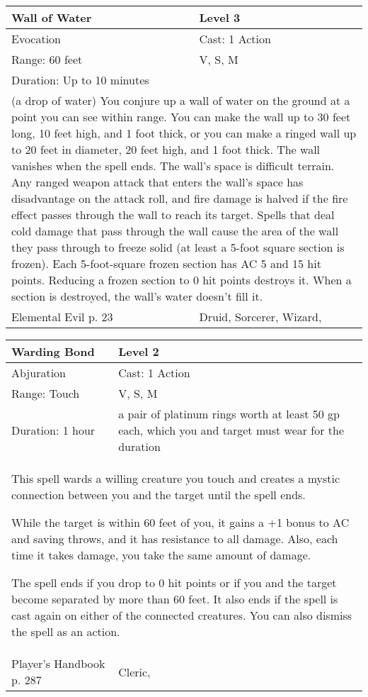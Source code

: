 \documentclass[11pt]{report}
\begin{document}
\begin{table}[H]
	\begin{tabular}{||p{6cm}|p{6cm}||}
		\hline\hline
		\bf{Wall of Water} & Level 3\\ \hline
		Evocation & Cast: 1 Action\\ \hline
		Range: 60 feet & V, S, M\\ \hline
		Duration: Up to 10 minutes & \\ \hline
		\multicolumn{2}{||p{12cm}||}{(a drop of water)
You conjure up a wall of water on the ground at a point you can see within range. You can make the wall up to 30 feet long, 10 feet high, and 1 foot thick, or you can make a ringed wall up to 20 feet in diameter, 20 feet high, and 1 foot thick. The wall vanishes when the spell ends. The wall’s space is difficult terrain.
Any ranged weapon attack that enters the wall’s space has disadvantage on the attack roll, and fire damage
is halved if the fire effect passes through the wall to reach its target. Spells that deal cold damage that pass through the wall cause the area of the wall they pass through to freeze solid (at least a 5-foot square section is frozen). Each 5-foot-square frozen section has AC 5 and 15 hit points. Reducing a frozen section to 0 hit points destroys it. When a section is destroyed, the wall’s water doesn’t fill it.}\\ \hline
Elemental Evil p. 23 & Druid, Sorcerer, Wizard, \\ \hline\hline
	\end{tabular}
\end{table}

\begin{table}[H]
	\begin{tabular}{||p{6cm}|p{6cm}||}
		\hline\hline
		\bf{Warding Bond} & Level 2\\ \hline
		Abjuration & Cast: 1 Action\\ \hline
		Range: Touch & V, S, M\\ \hline
		Duration: 1 hour & a pair of platinum rings worth at least 50 gp each, which you and target must wear for the duration\\ \hline
		\multicolumn{2}{||p{12cm}||}{This spell wards a willing creature you touch and creates a mystic connection between you and the target until the spell ends.

While the target is within 60 feet of you, it gains a +1 bonus to AC and saving throws, and it has resistance to all damage. Also, each time it takes damage, you take the same amount of damage.

The spell ends if you drop to 0 hit points or if you and the target become separated by more than 60 feet. It also ends if the spell is cast again on either of the connected creatures. You can also dismiss the spell as an action.}\\ \hline
Player's Handbook p. 287 & Cleric, \\ \hline\hline
	\end{tabular}
\end{table}
\end{document}
